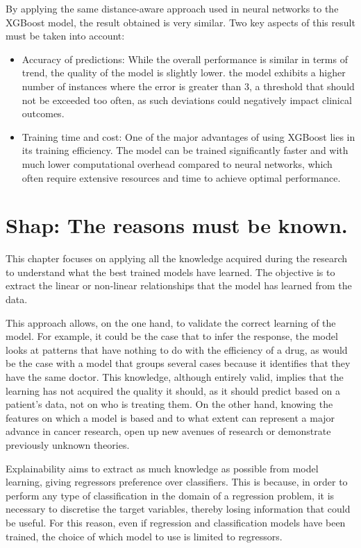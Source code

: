 By applying the same distance-aware approach used in neural networks to the XGBoost model, the result obtained is very similar. Two key aspects of this result must be taken into account:

\begin{itemize}
    \item Accuracy of predictions: While the overall performance is similar in terms of trend, the quality of the model is slightly lower. the model exhibits a higher number of instances where the error is greater than 3, a threshold that should not be exceeded too often, as such deviations could negatively impact clinical outcomes.
    \item Training time and cost: One of the major advantages of using XGBoost lies in its training efficiency. The model can be trained significantly faster and with much lower computational overhead compared to neural networks, which often require extensive resources and time to achieve optimal performance.
\end{itemize}


\section{Shap: The reasons must be known.}

This chapter focuses on applying all the knowledge acquired during the research to understand what the best trained models have learned. The objective is to extract the linear or non-linear relationships that the model has learned from the data.

This approach allows, on the one hand, to validate the correct learning of the model. For example, it could be the case that to infer the response, the model looks at patterns that have nothing to do with the efficiency of a drug, as would be the case with a model that groups several cases because it identifies that they have the same doctor. This knowledge, although entirely valid, implies that the learning has not acquired the quality it should, as it should predict based on a patient's data, not on who is treating them. On the other hand, knowing the features on which a model is based and to what extent can represent a major advance in cancer research, open up new avenues of research or demonstrate previously unknown theories.

Explainability aims to extract as much knowledge as possible from model learning, giving regressors preference over classifiers. This is because, in order to perform any type of classification in the domain of a regression problem, it is necessary to discretise the target variables, thereby losing information that could be useful. For this reason, even if regression and classification models have been trained, the choice of which model to use is limited to regressors.

